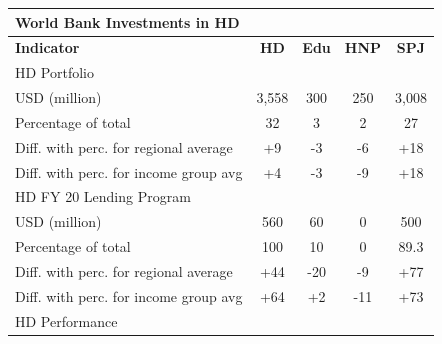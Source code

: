 \documentclass[9.2pt,twocolumn]{article}
\begin{document}
\begin{table}[H]
\small
\begin{tabular}{lcccc}
\textbf{World Bank Investments in HD}       & \textbf{}        & \textbf{}      & \textbf{} & \textbf{} \\\hline
\textbf{Indicator}       & \textbf{HD}        & \textbf{Edu}      & \textbf{HNP} & \textbf{SPJ} \\\hline
\cellcolor{iceberg}HD Portfolio      &    \cellcolor{iceberg}     &   \cellcolor{iceberg}    & \cellcolor{iceberg} & \cellcolor{iceberg} \\ \hline
USD (million)                    &      3,558                &     300                &   250        & 3,008         \\
Percentage of total        &        \cellcolor{asparagus}32               &     \cellcolor{arylideyellow}      3           &     \cellcolor{arylideyellow}  2         & \cellcolor{asparagus}27 \\
Diff. with perc. for regional average &         +9              &  -3                 &  -6        & +18 \\
Diff. with perc. for income group avg   &       +4                &     -3                  &    -9          &  +18 \\  \hline
\cellcolor{iceberg}HD FY 20 Lending Program      &   \cellcolor{iceberg}      & \cellcolor{iceberg}      & \cellcolor{iceberg} & \cellcolor{iceberg} \\ \hline
USD (million)                    &      560                &    60                 &    0      &  500     \\
Percentage of total        &      \cellcolor{asparagus}  100               &       \cellcolor{asparagus} 10            &    \cellcolor{blush} 0             &  \cellcolor{asparagus}89.3  \\
Diff. with perc. for regional average &   +44           &   -20           &       -9   &   +77   \\
Diff. with perc. for income group avg   &     +64                   &  +2                &     -11        &   +73   \\  \hline
\cellcolor{iceberg}HD Performance      &   \cellcolor{iceberg}      & \cellcolor{iceberg}      & \cellcolor{iceberg} & \cellcolor{iceberg} \\ \hline

\end{tabular}
\end{table}
\end{document}
